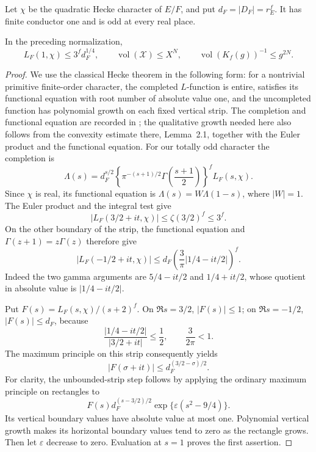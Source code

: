Let \(\chi\) be the quadratic Hecke character of \(E/F\),
and put \(d_F=|D_F|=r_E^f\).  It has finite conductor one
and is odd at every real place.

\begin{lemma}\label{dc-volume}
In the preceding normalization,
\begin{equation}\label{dc-volume-bound}
 L_F(1,\chi)\le3^f d_F^{1/4},\qquad
 \operatorname{vol}(\mathcal X)\le X^N,\qquad
 \operatorname{vol}(K_f(g))^{-1}\le g^{2N}.
\end{equation}
\end{lemma}
\begin{proof}
We use the classical Hecke theorem in the following form:
for a nontrivial primitive finite-order character, the
completed \(L\)-function is entire, satisfies its functional
equation with root number of absolute value one, and the
uncompleted function has polynomial growth on each fixed
vertical strip.  The completion and functional equation
are recorded in \cite[\S2.1, (2.1)--(2.3)]{zaman-hecke-estimates};
the qualitative growth needed here also follows from
the convexity estimate there, Lemma~2.1, together with
the Euler product and the functional equation.
For our totally odd character the completion is
\[
 \Lambda(s)=d_F^{s/2}
       \left\{\pi^{-(s+1)/2}
                    \Gamma\left(\frac{s+1}{2}\right)\right\}^{f}
                    L_F(s,\chi).
\]
Since \(\chi\) is real, its functional equation is
\(\Lambda(s)=W\Lambda(1-s)\), where \(|W|=1\).
The Euler product and the integral test give
\[
 |L_F(3/2+it,\chi)|\le\zeta(3/2)^f\le3^f.
\]
On the other boundary of the strip, the functional equation
and \(\Gamma(z+1)=z\Gamma(z)\) therefore give
\[
 |L_F(-1/2+it,\chi)|
       \le d_F\left(\frac{3}{\pi}
                            |1/4-it/2|\right)^f.
\]
Indeed the two gamma arguments are \(5/4-it/2\) and
\(1/4+it/2\), whose quotient in absolute value is
\(|1/4-it/2|\).

Put \(F(s)=L_F(s,\chi)/(s+2)^f\).  On
\(\Re s=3/2\), \(|F(s)|\le1\); on \(\Re s=-1/2\),
\(|F(s)|\le d_F\), because
\[
 \frac{|1/4-it/2|}{|3/2+it|}\le\frac12,\qquad
                         \frac{3}{2\pi}<1.
\]
The maximum principle on this strip consequently yields
\[
 |F(\sigma+it)|\le d_F^{(3/2-\sigma)/2}.
\]
For clarity, the unbounded-strip step follows by applying
the ordinary maximum principle on rectangles to
\[
 F(s)d_F^{(s-3/2)/2}
                  \exp\{\varepsilon(s^2-9/4)\}.
\]
Its vertical boundary values have absolute value at most
one.  Polynomial vertical growth makes its horizontal
boundary values tend to zero as the rectangle grows.
Then let \(\varepsilon\) decrease to zero.  Evaluation at
\(s=1\) proves the first assertion.


\end{proof}

